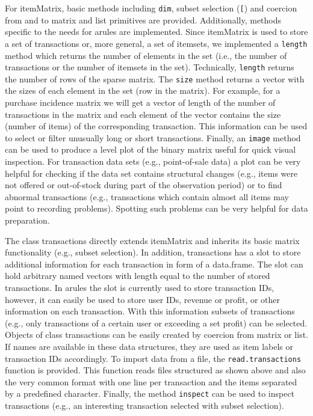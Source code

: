 \documentclass[10pt,a4paper]{article}
\newcommand{\strong}[1]{{\normalfont\fontseries{b}\selectfont #1}}
\newcommand{\class}[1]{\textsf{#1}}
\newcommand{\code}[1]{\texttt{#1}}
\newcommand{\pkg}[1]{\strong{#1}}
\begin{document}
For \class{itemMatrix}, basic methods including \code{dim}, subset
selection (\code{[}) and coercion from and to \class{matrix} and
\class{list} primitives are provided.  Additionally, methods specific to
the needs for \pkg{arules} are implemented. Since \class{itemMatrix} is
used to store a set of transactions or, more general, a set of itemsets,
we implemented a \code{length} method which returns the number of
elements in the set (i.e., the number of transactions or the number of
itemsets in the set).  Technically, \code{length} returns the number of
rows of the sparse matrix.  The \code{size} method returns a vector with
the sizes of each element in the set (row in the matrix).  For example,
for a purchase incidence matrix we will get a vector of length of the
number of transactions in the matrix and each element of the vector
contains the size (number of items) of the corresponding transaction.
This information can be used to select or filter unusually long or short
transactions.  Finally, an \code{image} method can be used to produce a
level plot of the binary matrix useful for quick visual inspection.  For
transaction data sets (e.g., point-of-sale data) a plot can be very
helpful for checking if the data set contains structural changes (e.g.,
items were not offered or out-of-stock during part of the observation
period) or to find abnormal transactions (e.g., transactions which
contain almost all items may point to recording problems).  Spotting
such problems can be very helpful for data preparation.

The class \class{transactions} directly extends \class{itemMatrix}
and inherits its basic matrix functionality (e.g., subset selection).
In addition, \class{transactions} has 
a slot to store additional information for each
transaction in form of a \class{data.frame}.
The slot can hold arbitrary named vectors with length equal to the
number of stored transactions.
In \pkg{arules} the slot is currently used to store transaction IDs,
however, it can easily be used to store user IDs, revenue or profit,
or other information on each transaction.
With this information subsets of transactions
(e.g., only transactions of a certain user or exceeding a set profit)
can be selected.
Objects of class \class{transactions} can be easily 
created by coercion from \class{matrix} or \class{list}.
If names are available in these data structures,
they are used as item labels or transaction IDs accordingly. 
To import data from a file, the \code{read.transactions} function is
provided. This function 
reads files structured as shown above and also the
very common format with 
one line per transaction
and the items separated by a predefined character.
Finally, the method \code{inspect} can be used to 
inspect transactions (e.g., an interesting transaction selected
with subset selection).
\end{document}
